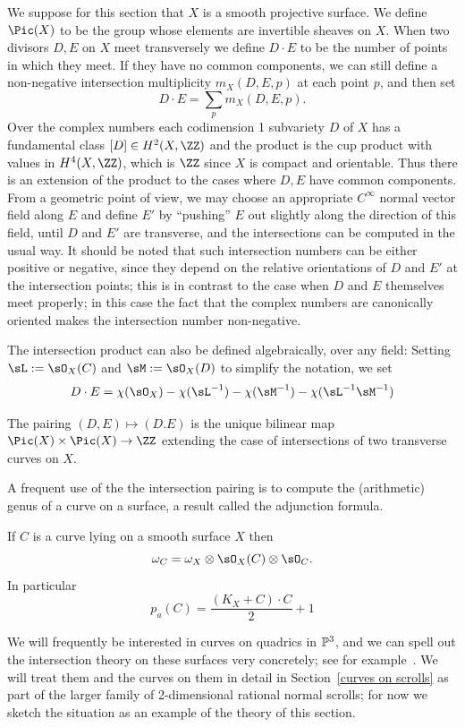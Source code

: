  We suppose for this section that $X$ is a smooth projective surface.
 We define $\Pic(X)$ to be the group whose elements are invertible sheaves on $X$.
When two divisors $D,E$ on $X$ meet transversely we define $D\cdot E$ to be the number of points in which they meet. If they have no common
components, we can still define a non-negative intersection multiplicity $m_X(D,E,p)$ at each point $p$, and then set
$$
D\cdot E = \sum_p m_X(D,E,p).
$$
Over the complex numbers each codimension 1 subvariety $D$ of $X$ has a fundamental class
$[D]\in H^2(X, \ZZ)$ and the product is the cup product with values in $H^4(X,\ZZ)$, which is $\ZZ$ since $X$ is compact and orientable. Thus
there is an extension of the product to the cases where $D,E$ have common components. From a geometric point of view, we may choose an
appropriate $C^\infty$
normal vector field along $E$ and define $E'$ by ``pushing'' $E$ out slightly along the direction of this field, until $D$ and $E'$ are transverse,
and the intersections can be computed in the usual way. It should be noted that such intersection numbers can be either positive or negative,
since they depend on the relative orientations of $D$ and $E'$ at the intersection points; this is in contrast to the case when $D$ and $E$
themselves meet properly; in this case the fact that the complex numbers are canonically oriented makes the intersection number non-negative.

The intersection product can also be defined algebraically, over any field: Setting $\sL := \sO_X(C)$ and
$\sM := \sO_X(D)$ to simplify the notation, we set 
$$
D\cdot E = \chi(\sO_X)-\chi(\sL^{-1}) -\chi(\sM^{-1}) -\chi(\sL^{-1}\sM^{-1}) 
$$
\begin{theorem} The pairing $(D,E) \mapsto (D.E)$ is the unique bilinear map
$\Pic(X) \times \Pic(X) \to \ZZ$ extending the case of intersections of two transverse curves on $X$. 
\end{theorem}

A frequent use of the the intersection pairing is to compute the (arithmetic) genus of a curve on a surface,
a result called the adjunction formula.

\begin{theorem}\label{adjunction formula}
If $C$ is a curve lying on a smooth surface $X$ then 
$$
\omega_C = \omega_X \otimes \sO_X(C) \otimes \sO_C.
$$
In particular \label{genus formula}
$$
p_a(C) = \frac{(K_X+C)\cdot C}{2} +1
 $$
\end{theorem}

We will frequently be interested in curves on quadrics in $\PP^3$, and we can spell out the
intersection theory on these surfaces very concretely; see for example~\cite[****]{Hartshorne1977}.
We will treat them and the curves on them in detail in Section~\ref{curves on scrolls} as part of the larger family of 2-dimensional rational normal scrolls; for
now we sketch the situation as an example of the theory of this section. 

